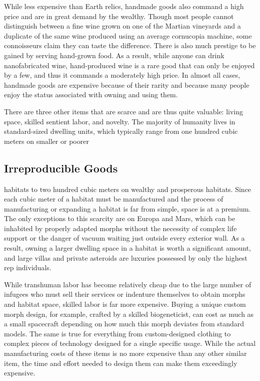 While less expensive than Earth relics, handmade 
goods also command a high price and are in great 
demand by the wealthy. Though most people cannot 
distinguish between a fine wine grown on one of 
the Martian vineyards and a duplicate of the same 
wine produced using an average cornucopia machine, 
some connoisseurs claim they can taste the difference. 
There is also much prestige to be gained by serving 
hand-grown food. As a result, while anyone can drink 
nanofabricated wine, hand-produced wine is a rare 
good that can only be enjoyed by a few, and thus 
it commands a moderately high price. In almost all 
cases, handmade goods are expensive because of their 
rarity and because many people enjoy the status associated
with owning and using them.

There are three other items that are scarce and 
are thus quite valuable: living space, skilled sentient 
labor, and novelty. The majority of humanity lives in 
standard-sized dwelling units, which typically range 
from one hundred cubic meters on smaller or poorer 

\subsection{Irreproducible Goods}

habitats to two hundred cubic meters on wealthy 
and prosperous habitats. Since each cubic meter of 
a habitat must be manufactured and the process of 
manufacturing or expanding a habitat is far from 
simple, space is at a premium. The only exceptions 
to this scarcity are on Europa and Mars, which can 
be inhabited by properly adapted morphs without 
the necessity of complex life support or the danger of 
vacuum waiting just outside every exterior wall. As 
a result, owning a larger dwelling space in a habitat 
is worth a significant amount, and large villas and 
private asteroids are luxuries possessed by only the 
highest rep individuals.

While transhuman labor has become relatively 
cheap due to the large number of infugees who must 
sell their services or indenture themselves to obtain 
morphs and habitat space, skilled labor is far more 
expensive. Buying a unique custom morph design, for 
example, crafted by a skilled biogeneticist, can cost as 
much as a small spacecraft depending on how much 
this morph deviates from standard models. The same 
is true for everything from custom-designed clothing 
to complex pieces of technology designed for a single 
specific usage. While the actual manufacturing costs 
of these items is no more expensive than any other 
similar item, the time and effort needed to design 
them can make them exceedingly expensive.

